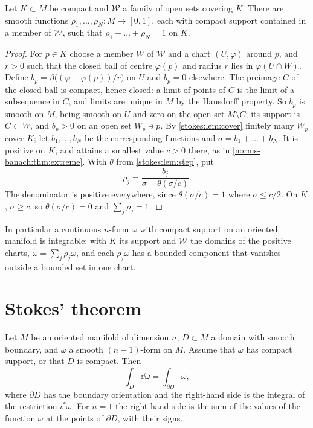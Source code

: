 \begin{notechapter}
\begin{lemma}
\label{stokes:lem:pou}
Let $K\subset M$ be compact and $\mathcal W$ a family of open sets
covering $K$. There are smooth functions
$\rho_1,\dots,\rho_N:M\to[0, 1]$, each with compact support contained
in a member of $\mathcal W$, such that
$\rho_1 + \dots + \rho_N = 1$ on $K$.
\end{lemma}

\begin{proof}
For $p\in K$ choose a member $W$ of $\mathcal W$ and a chart
$(U, \varphi)$ around $p$, and $r > 0$ such that the closed ball of
centre $\varphi(p)$ and radius $r$ lies in $\varphi(U\cap W)$. Define
$b_p = \beta\bigl((\varphi - \varphi(p))/r\bigr)$ on $U$ and $b_p = 0$
elsewhere. The preimage $C$ of the closed ball is compact, hence
closed: a limit of points of $C$ is the limit of a subsequence in $C$,
and limits are unique in $M$ by the Hausdorff property. So $b_p$ is
smooth on $M$, being smooth on $U$ and zero on the open set
$M\setminus C$; its support is $C\subset W$, and $b_p > 0$ on an open
set $W_p\ni p$. By \cref{stokes:lem:cover} finitely many $W_p$ cover
$K$; let $b_1,\dots,b_N$ be the corresponding functions and
$\sigma = b_1 + \dots + b_N$. It is positive on $K$, and attains a
smallest value $c > 0$ there, as in
\cref{norms-banach:thm:extreme}. With $\theta$ from
\cref{stokes:lem:step}, put
\[
  \rho_j = \frac{b_j}{\sigma + \theta(\sigma/c)} .
\]
The denominator is positive everywhere, since
$\theta(\sigma/c) = 1$ where $\sigma\leq c/2$. On $K$, $\sigma\geq c$,
so $\theta(\sigma/c) = 0$ and $\sum_j\rho_j = 1$.
\end{proof}

In particular a continuous $n$-form $\omega$ with compact support on an
oriented manifold is integrable: with $K$ its support and $\mathcal W$
the domains of the positive charts, $\omega = \sum_j\rho_j\omega$, and
each $\rho_j\omega$ has a bounded component that vanishes outside a
bounded set in one chart.

\section{Stokes' theorem}\label{stokes:sec:stokes}

\begin{theorem}[Stokes]\label{stokes:thm:stokes}
Let $M$ be an oriented manifold of dimension $n$, $D\subset M$ a domain
with smooth boundary, and $\omega$ a smooth $(n - 1)$-form on $M$.
Assume that $\omega$ has compact support, or that $D$ is compact. Then
\[
  \int_D\dd\omega = \int_{\partial D}\omega ,
\]
where $\partial D$ has the boundary orientation and the right-hand side
is the integral of the restriction $\iota^*\omega$. For $n = 1$ the
right-hand side is the sum of the values of the function $\omega$ at
the points of $\partial D$, with their signs.
\end{theorem}


\end{notechapter}
